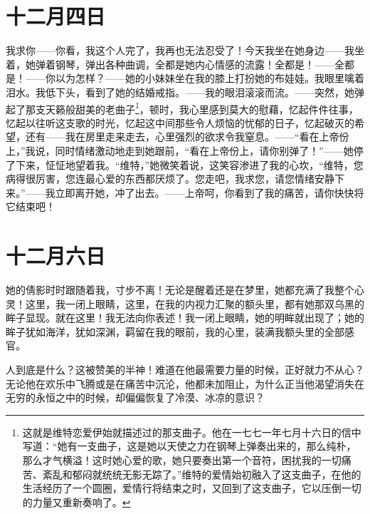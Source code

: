 \documentclass[12pt,oneside]{book}
\begin{document}
\chapter{十二月四日}
我求你——你看，我这个人完了，我再也无法忍受了！今天我坐在她身边——我坐着，她弹着钢琴，弹出各种曲调，全都是她内心情感的流露！全都是！——全都是！——你以为怎样？——她的小妹妹坐在我的膝上打扮她的布娃娃。我眼里噙着泪水。我低下头，看到了她的结婚戒指。——我的眼泪滚滚而流。——突然，她弹起了那支天籁般甜美的老曲子\footnote{这就是维特恋爱伊始就描述过的那支曲子。他在一七七一年七月十六日的信中写道：“她有一支曲子，这是她以天使之力在钢琴上弹奏出来的，那么纯朴，那么才气横溢！这时她心爱的歌，她只要奏出第一个音符，困扰我的一切痛苦、紊乱和郁闷就统统无影无踪了。”维特的爱情始初融入了这支曲子，在他的生活经历了一个圆圈，爱情行将结束之时，又回到了这支曲子，它以压倒一切的力量又重新奏响了。}，顿时，我心里感到莫大的慰藉，忆起件件往事，忆起以往听这支歌的时光，忆起这中间那些令人烦恼的忧郁的日子，忆起破灭的希望，还有——我在房里走来走去，心里强烈的欲求令我窒息。——“看在上帝份上，”我说，同时情绪激动地走到她跟前，“看在上帝份上，请你别弹了！”——她停了下来，怔怔地望着我。“维特，”她微笑着说，这笑容渗进了我的心坎，“维特，您病得很厉害，您连最心爱的东西都厌烦了。您走吧，我求您，请您情绪安静下来。”——我立即离开她，冲了出去。——上帝呵，你看到了我的痛苦，请你快快将它结束吧！
　　

\chapter{十二月六日}
她的倩影时时跟随着我，寸步不离！无论是醒着还是在梦里，她都充满了我整个心灵！这里，我一闭上眼睛，这里，在我的内视力汇聚的额头里，都有她那双乌黑的眸子显现。就在这里！我无法向你表述！我一闭上眼睛，她的明眸就出现了；她的眸子犹如海洋，犹如深渊，羁留在我的眼前，我的心里，装满我额头里的全部感官。

人到底是什么？这被赞美的半神！难道在他最需要力量的时候，正好就力不从心？无论他在欢乐中飞腾或是在痛苦中沉沦，他都未加阻止，为什么正当他渴望消失在无穷的永恒之中的时候，却偏偏恢复了冷漠、冰凉的意识？
\end{document}
